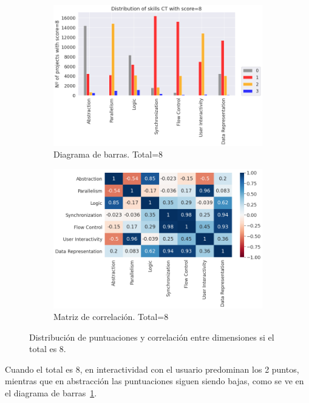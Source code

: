 \documentclass[a4paper, 12pt]{book}
\begin{document}
\begin{figure}
    \centering
    \begin{subfigure}[h]{.49\textwidth} 
        \includegraphics[width=\textwidth]{img/distribucion_8_Scratch}
        \caption{Diagrama de barras. Total=8}
        \label{fig:total8}
    \end{subfigure}       
    \begin{subfigure}[h]{.49\textwidth} 
        \includegraphics[width=\textwidth]{img/corr_8_Scratch}
        \caption{Matriz de correlación. Total=8}
        \label{fig:corr8}
    \end{subfigure}
     \caption{Distribución de puntuaciones y correlación entre dimensiones si el total es 8.}
\end{figure}

Cuando el total es 8, en interactividad con el usuario predominan los 2 puntos, mientras que en abstracción las puntuaciones siguen siendo bajas, como se ve en el diagrama de barras~\ref{fig:total8}.
\end{document}
